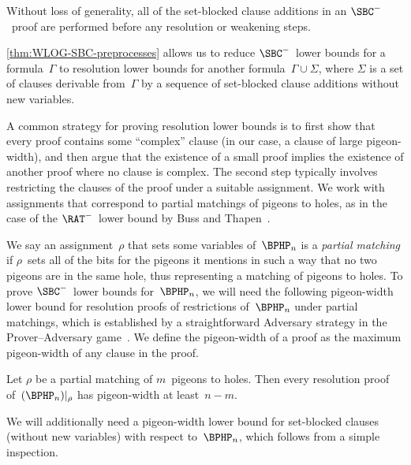 \documentclass[12pt]{article}
\begin{document}
\begin{lemma}\label{thm:WLOG-SBC-preprocesses}
  Without loss of generality,
  all of the set-blocked clause additions in an $\SBC^-$~proof
  are performed before any resolution or weakening steps.
\end{lemma}

\cref{thm:WLOG-SBC-preprocesses} allows us to reduce
$\SBC^-$~lower bounds for a formula~$\Gamma$
to resolution lower bounds for another formula~$\Gamma \cup \Sigma$,
where $\Sigma$ is a set of clauses derivable from~$\Gamma$
by a sequence of set-blocked clause additions without new variables.

A common strategy for proving resolution lower bounds is to
first show that every proof contains some ``complex'' clause
(in our case, a clause of large pigeon-width),
and then argue that the existence of a small proof
implies the existence of another proof where no clause is complex.
The second step typically involves restricting
the clauses of the proof under a suitable assignment.
We work with assignments that correspond to
partial matchings of pigeons to holes,
as in the case of the $\RAT^-$~lower bound
by Buss and Thapen~\cite[Section~5]{BT21}.

We say an assignment~$\rho$ that sets some variables of~$\BPHP_n$
is a \emph{partial matching} if $\rho$~sets
all of the bits for the pigeons it mentions
in such a way that no two pigeons are in the same hole,
thus representing a matching of pigeons to holes.
To prove $\SBC^-$~lower bounds for~$\BPHP_n$,
we will need the following pigeon-width lower bound
for resolution proofs of restrictions of~$\BPHP_n$ under partial matchings,
which is established by a straightforward Adversary strategy
in the Prover--Adversary game~\cite{Pud00}.
We define the pigeon-width of a proof
as the maximum pigeon-width of any clause in the proof.

\begin{lemma}[{\cite[Lemma~5.2]{BT21}}]\label{thm:resolution-width-lower-bound-for-BPHP}
  Let $\rho$ be a partial matching of $m$~pigeons to holes.
  Then every resolution proof of~$(\BPHP_n)|_\rho$
  has pigeon-width at least~$n - m$.
\end{lemma}

We will additionally need a pigeon-width lower bound for
set-blocked clauses (without new variables)
with respect to~$\BPHP_n$, which follows from a simple inspection.
\end{document}
